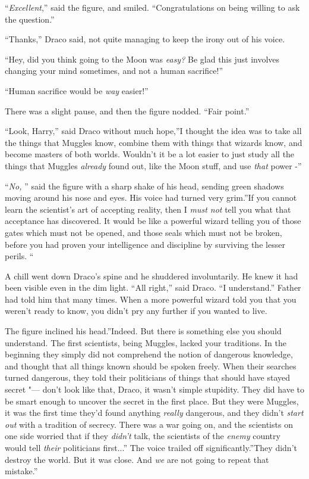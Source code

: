 ``\emph{Excellent},'' said the figure, and smiled. ``Congratulations on
being willing to ask the question.''

``Thanks,'' Draco said, not quite managing to keep the irony out of his
voice.

``Hey, did you think going to the Moon was \emph{easy?} Be glad this just
involves changing your mind sometimes, and not a human sacrifice!''

``Human sacrifice would be \emph{way} easier!''

There was a slight pause, and then the figure nodded. ``Fair point.''

``Look, Harry,'' said Draco without much hope,''I thought the idea was
to take all the things that Muggles know, combine them with things that
wizards know, and become masters of both worlds. Wouldn't it be a lot
easier to just study all the things that Muggles \emph{already} found
out, like the Moon stuff, and use \emph{that} power -''

``\emph{No,} '' said the figure with a sharp shake of his head, sending
green shadows moving around his nose and eyes. His voice had turned very
grim.''If you cannot learn the scientist's art of accepting reality,
then I \emph{must not} tell you what that acceptance has discovered. It
would be like a powerful wizard telling you of those gates which must
not be opened, and those seals which must not be broken, before you had
proven your intelligence and discipline by surviving the lesser perils.
``

A chill went down Draco's spine and he shuddered involuntarily. He knew
it had been visible even in the dim light. ``All right,'' said Draco.
``I understand.'' Father had told him that many times. When a more
powerful wizard told you that you weren't ready to know, you didn't pry
any further if you wanted to live.

The figure inclined his head.''Indeed. But there is something else you
should understand. The first scientists, being Muggles, lacked your
traditions. In the beginning they simply did not comprehend the notion
of dangerous knowledge, and thought that all things known should be
spoken freely. When their searches turned dangerous, they told their
politicians of things that should have stayed secret "--- don't look like
that, Draco, it wasn't simple stupidity. They did have to be smart
enough to uncover the secret in the first place. But they were Muggles,
it was the first time they'd found anything \emph{really} dangerous, and
they didn't \emph{start out} with a tradition of secrecy. There was a
war going on, and the scientists on one side worried that if they
\emph{didn't} talk, the scientists of the \emph{enemy} country would
tell \emph{their} politicians first...'' The voice trailed off
significantly.''They didn't destroy the world. But it was close. And
\emph{we} are not going to repeat that mistake.''

